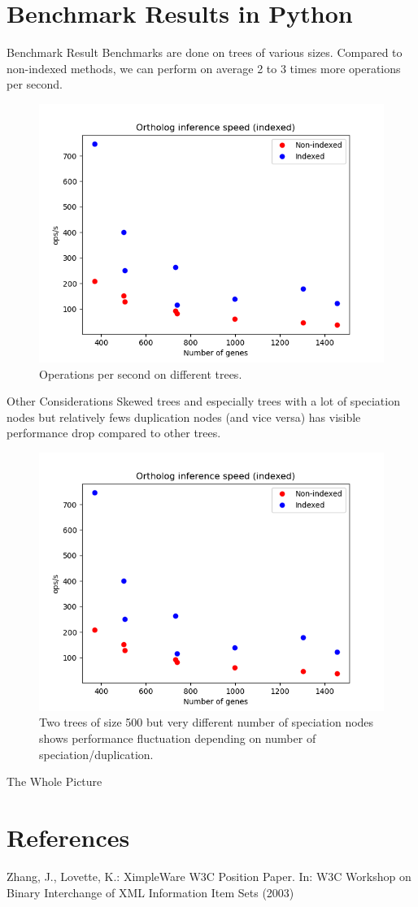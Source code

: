 \documentclass{beamer}
\begin{document}
\section{Benchmark Results in Python}

\begin{frame}{Benchmark Result}
    Benchmarks are done on trees of various sizes. Compared to non-indexed methods, we can perform on average 2 to 3 times more operations per second.

    \begin{figure}[htbp]
        \centering
        \includegraphics[width=0.5\linewidth]{res/ortholog_inference_performance_number_indexed.png}
        \caption{Operations per second on different trees.}
        \label{fig:ops-per-sec-plot}
    \end{figure}
\end{frame}

\begin{frame}{Other Considerations}
    Skewed trees and especially trees with a lot of speciation nodes but relatively fews duplication nodes (and vice versa) has visible performance drop compared to other trees.
    \begin{figure}[htbp]
        \centering
        \includegraphics[width=0.5\linewidth]{res/ortholog_inference_performance_number_indexed.png}
        \caption{Two trees of size 500 but very different number of speciation nodes shows performance fluctuation depending on number of speciation/duplication.}
        \label{fig:ops-per-sec-plot-skew}
    \end{figure}
\end{frame}

\begin{frame}{The Whole Picture}
    
\end{frame}

\section{References}

\begin{frame}
    \scriptsize

    Zhang, J., Lovette, K.: XimpleWare W3C Position Paper. In: W3C Workshop on Binary Interchange of XML Information Item Sets (2003)
\end{frame}
\end{document}
